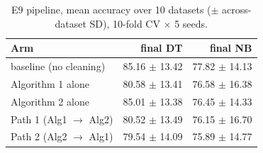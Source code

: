 \begin{table}[t]
\caption{E9 pipeline, mean accuracy over 10 datasets ($\pm$ across-dataset SD), 10-fold CV $\times$ 5 seeds.}
\label{tab:e9}
\centering\small
\begin{tabular}{lrr}
\toprule
Arm & final DT & final NB \\
\midrule
baseline (no cleaning) & 85.16 $\pm$ 13.42 & 77.82 $\pm$ 14.13 \\
Algorithm 1 alone & 80.58 $\pm$ 13.41 & 76.58 $\pm$ 16.38 \\
Algorithm 2 alone & 85.01 $\pm$ 13.38 & 76.45 $\pm$ 14.33 \\
Path 1 (Alg1 $\to$ Alg2) & 80.52 $\pm$ 13.49 & 76.15 $\pm$ 16.70 \\
Path 2 (Alg2 $\to$ Alg1) & 79.54 $\pm$ 14.09 & 75.89 $\pm$ 14.77 \\
\bottomrule
\end{tabular}
\end{table}
